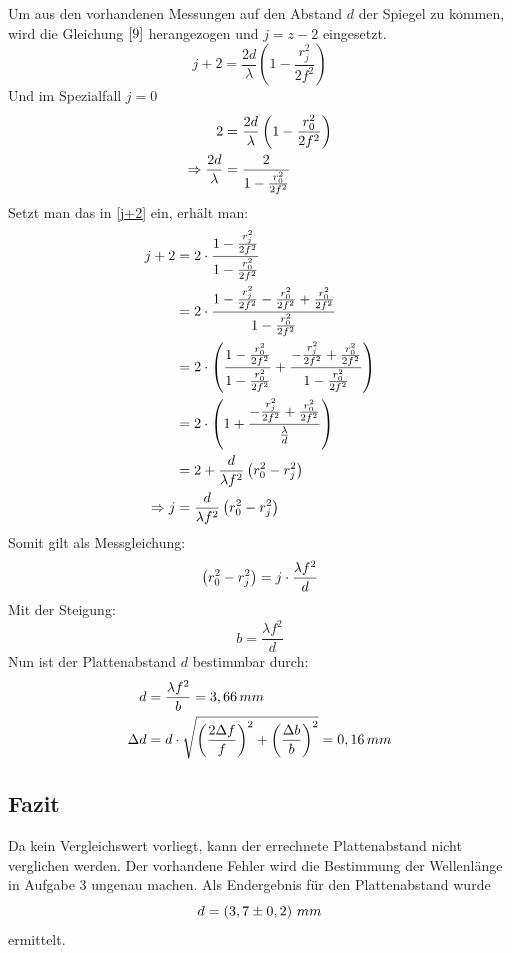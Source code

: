 Um aus den vorhandenen Messungen auf den Abstand \(d\) der Spiegel zu kommen, wird die Gleichung $\eqref{9}$ herangezogen und \(j = z - 2 \) eingesetzt.
\begin{equation}
j + 2 = \frac{2d}{\lambda}\left(1 - \frac{r_j^2}{2f^2}\right)
\label{j+2}
\end{equation}
Und im Spezialfall \(j=0\)
\begin{align}
2 &= \frac{2d}{\lambda}\left(1 - \frac{r_0^2}{2f^2}\right)
\notag\\
\Rightarrow \frac{2d}{\lambda} &= \frac{2}{1 - \frac{r_0^2}{2f^2}}
\notag
\end{align}
Setzt man das in \eqref{j+2} ein, erhält man:
\begin{align}
j+2 &= 2 \cdot \frac{1 - \frac{r_j^2}{2f^2}}{1 - \frac{r_0^2}{2f^2}} \notag \\
&= 2 \cdot \frac{1 - \frac{r_j^2}{2f^2} - \frac{r_0^2}{2f^2} + \frac{r_0^2}{2f^2}}{1 - \frac{r_0^2}{2f^2}} \notag \\
 &= 2 \cdot \left( \frac{1 - \frac{r_0^2}{2f^2}}{1 - \frac{r_0^2}{2f^2}} + \frac{- \frac{r_j^2}{2f^2} + \frac{r_0^2}{2f^2}}{1 - \frac{r_0^2}{2f^2}}\right) \notag \\
 &= 2 \cdot \left( 1 + \frac{- \frac{r_j^2}{2f^2} + \frac{r_0^2}{2f^2}}{\frac{\lambda}{d}} \right) \notag \\
 &= 2 + \frac{d}{\lambda f^2} \left( r_0^2 - r_j^2 \right) \notag \\
 \Rightarrow j &= \frac{d}{\lambda f^2} \left( r_0^2 - r_j^2 \right) \notag
\end{align}
Somit gilt als Messgleichung: 
\begin{equation}
\left( r_0^2 - r_j^2 \right) = j \cdot \frac{\lambda f^2}{d} \notag
\end{equation}
Mit der Steigung:
\begin{equation}
b = \frac{\lambda f^2}{d}
\label{b}
\end{equation}
Nun ist der Plattenabstand \(d\) bestimmbar durch:
\begin{align}
d &= \frac{\lambda f^2}{b} = 3,66\,mm \notag\\
\Delta d &= d\cdot \sqrt{
\left( \frac{2\Delta f}{f} \right)^2+
\left( \frac{\Delta b}{b} \right)^2
} = 0,16\,mm \notag
\end{align}
\subsection{Fazit}
Da kein Vergleichswert vorliegt, kann der errechnete Plattenabstand nicht verglichen werden. Der vorhandene Fehler wird die Bestimmung der Wellenlänge in Aufgabe 3 ungenau machen. Als Endergebnis für den Plattenabstand wurde
\begin{equation}
d = \left( 3,7 \pm 0,2 \right)\,mm
\notag
\end{equation}
ermittelt.